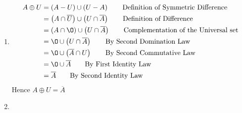 \documentclass[12pt letter]{report}
\begin{document}
{\begin{enumerate}
\begin{align*}
{            set}                                                                                                               \\
                        & = \left( A \right) \cup \left( \O \cap \overline{A} \right) \tag*{By First Identity Law}             \\
                        & = A \cup \left( \overline{A} \cap \O \right) \tag*{By Second Commutative Law}                        \\
                        & = A \cup \O \tag*{By Second Domination Law}                                                          \\
                        & = A \tag*{By Second Identity Law}                                                                    \\
          \end{align*}
          Hence $A \oplus \O = A$
    \item
          \begin{align*}
            A \oplus U & = \left( A - U \right) \cup \left( U - A \right) \tag*{Definition of Symmetric Difference}       \\
                       & = \left( A \cap \overline{U} \right) \cup \left( U \cap \overline{A} \right) \tag*{Definition of
            Difference}                                                                                                   \\
                       & = \left( A \cap \O \right) \cup \left( U \cap \overline{A} \right) \tag*{Complementation of the
            Universal set}                                                                                                \\
                       & = \O \cup \left( U \cap \overline{A} \right) \tag*{By Second Domination Law }                    \\
                       & = \O \cup \left( \overline{A} \cap U  \right) \tag*{By Second Commutative Law}                   \\
                       & = \O \cup \overline{A} \tag*{By First Identity Law}                                              \\
                       & = \overline{A} \tag*{By Second Identity Law}                                                     \\
          \end{align*}
          Hence $A \oplus U = \overline{A}$
    \item

\end{enumerate}}
\end{document}
